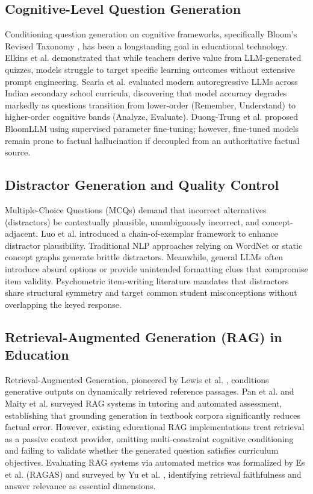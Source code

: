 \documentclass[conference]{IEEEtran}
\begin{document}
\subsection{Cognitive-Level Question Generation}
Conditioning question generation on cognitive frameworks, specifically Bloom's Revised Taxonomy \cite{bloom1956taxonomy, anderson2001taxonomy}, has been a longstanding goal in educational technology. Elkins et al. \cite{elkins2024teachers} demonstrated that while teachers derive value from LLM-generated quizzes, models struggle to target specific learning outcomes without extensive prompt engineering. Scaria et al. \cite{scaria2024modern} evaluated modern autoregressive LLMs across Indian secondary school curricula, discovering that model accuracy degrades markedly as questions transition from lower-order (Remember, Understand) to higher-order cognitive bands (Analyze, Evaluate). Duong-Trung et al. \cite{duong2024bloomllm} proposed BloomLLM using supervised parameter fine-tuning; however, fine-tuned models remain prone to factual hallucination if decoupled from an authoritative factual source.

\subsection{Distractor Generation and Quality Control}
Multiple-Choice Questions (MCQs) demand that incorrect alternatives (distractors) be contextually plausible, unambiguously incorrect, and concept-adjacent. Luo et al. \cite{luo2024chain} introduced a chain-of-exemplar framework to enhance distractor plausibility. Traditional NLP approaches relying on WordNet or static concept graphs generate brittle distractors. Meanwhile, general LLMs often introduce absurd options or provide unintended formatting clues that compromise item validity. Psychometric item-writing literature \cite{haladyna2002review} mandates that distractors share structural symmetry and target common student misconceptions without overlapping the keyed response.

\subsection{Retrieval-Augmented Generation (RAG) in Education}
Retrieval-Augmented Generation, pioneered by Lewis et al. \cite{lewis2020retrieval}, conditions generative outputs on dynamically retrieved reference passages. Pan et al. \cite{pan2025survey} and Maity et al. \cite{maity2025leveraging} surveyed RAG systems in tutoring and automated assessment, establishing that grounding generation in textbook corpora significantly reduces factual error. However, existing educational RAG implementations treat retrieval as a passive context provider, omitting multi-constraint cognitive conditioning and failing to validate whether the generated question satisfies curriculum objectives. Evaluating RAG systems via automated metrics was formalized by Es et al. (RAGAS) \cite{es2024ragas} and surveyed by Yu et al. \cite{yu2024evaluation}, identifying retrieval faithfulness and answer relevance as essential dimensions.
\end{document}
